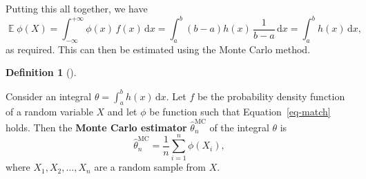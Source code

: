 \documentclass[
  letterpaper,
  DIV=11,
  numbers=noendperiod]{scrreprt}
\newcommand{\Exg}{\operatorname{\mathbb{E}}}
\theoremstyle{plain}
\theoremstyle{definition}
\newtheorem{definition}{Definition}[chapter]
\theoremstyle{definition}
\theoremstyle{remark}
\begin{document}
Putting this all together, we have
\[ \Exg \phi(X) = \int_{-\infty}^{+\infty} \phi(x)\,f(x)\,\mathrm{d}x = \int_a^b (b-a)h(x)\,\frac{1}{b-a}\,\mathrm{d}x = \int_a^b h(x) \,\mathrm{d}x ,\]
as required. This can then be estimated using the Monte Carlo method.

\begin{definition}[]\protect\hypertarget{def-MCint}{}\label{def-MCint}

Consider an integral \(\theta = \int_a^b h(x)\,\mathrm{d}x\). Let \(f\)
be the probability density function of a random variable \(X\) and let
\(\phi\) be function such that Equation~\ref{eq-match} holds. Then the
\textbf{Monte Carlo estimator} \(\widehat\theta_n^{\mathrm{MC}}\) of the
integral \(\theta\) is
\[ \widehat{\theta}_n^{\mathrm{MC}} = \frac{1}{n} \sum_{i=1}^n \phi(X_i) , \]
where \(X_1, X_2, \dots, X_n\) are a random sample from \(X\).

\end{definition}
\end{document}
